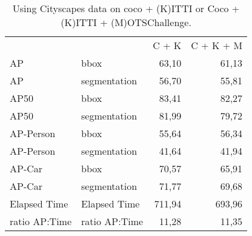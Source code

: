 \documentclass[12pt,a4paper,twocolumn,twoside]{article}
\begin{document}
\begin{table*}[]
\centering
\begin{tabularx}{\textwidth}{|l|l|r|r|} \hline
              &               & \multicolumn{1}{l|}{C + K} & \multicolumn{1}{l|}{C + K + M} \\ \cline{1-4}
AP            & bbox          & 63,10                      & 61,13                          \\ \cline{1-4}
AP            & segmentation  & 56,70                      & 55,81                          \\ \cline{1-4}
AP50          & bbox          & 83,41                      & 82,27                          \\ \cline{1-4}
AP50          & segmentation  & 81,99                      & 79,72                          \\ \cline{1-4}
AP-Person     & bbox          & 55,64                      & 56,34                          \\ \cline{1-4}
AP-Person     & segmentation  & 41,64                      & 41,94                          \\ \cline{1-4}
AP-Car        & bbox          & 70,57                      & 65,91                          \\ \cline{1-4}
AP-Car        & segmentation  & 71,77                      & 69,68                          \\ \cline{1-4}
Elapsed Time  & Elapsed Time  & 711,94                     & 693,96                         \\ \cline{1-4}
ratio AP:Time & ratio AP:Time & 11,28                      & 11,35                          \\ \cline{1-4} 
\end{tabularx}
\caption{\label{table:task_b_coco_cityscapes_kittimots_motschallenge}Using Cityscapes data on coco + (K)ITTI or Coco + (K)ITTI + (M)OTSChallenge.}
\end{table*}

\printbibliography
\end{document}
